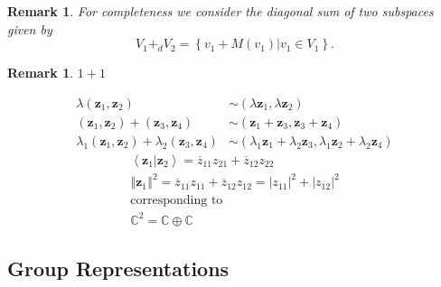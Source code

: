 \documentclass[aps,preprint]{revtex4}
\newtheorem{remark}[theorem]{Remark}
\begin{document}
\begin{remark}
For completeness we consider the \emph{diagonal} \emph{sum of two subspaces }%
given by\emph{\ }%
\begin{equation}
V_{1}+_{d}V_{2}=\left\{ \left. v_{1}+M\left( v_{1}\right) \right\vert
v_{1}\in V_{1}\right\} .
\end{equation}
\end{remark}

\begin{remark}
$1+1$
\end{remark}

\begin{align}
\lambda \left( \mathbf{z}_{1},\mathbf{z}_{2}\right) & \sim \left( \lambda 
\mathbf{z}_{1},\lambda \mathbf{z}_{2}\right) \\
\left( \mathbf{z}_{1},\mathbf{z}_{2}\right) +\left( \mathbf{z}_{3},\mathbf{z}%
_{4}\right) & \sim \left( \mathbf{z}_{1}+\mathbf{z}_{3},\mathbf{z}_{3}+%
\mathbf{z}_{4}\right) \\
\lambda _{1}\left( \mathbf{z}_{1},\mathbf{z}_{2}\right) +\lambda _{2}\left( 
\mathbf{z}_{3},\mathbf{z}_{4}\right) & \sim \left( \lambda _{1}\mathbf{z}%
_{1}+\lambda _{2}\mathbf{z}_{3},\lambda _{1}\mathbf{z}_{2}+\lambda _{2}%
\mathbf{z}_{4}\right)
\end{align}%
\begin{gather}
\left\langle \left. \mathbf{z}_{1}\right\vert \mathbf{z}_{2}\right\rangle =%
\overline{z}_{11}z_{21}+\overline{z}_{12}z_{22}\text{ } \\
\left\Vert \mathbf{z}_{1}\right\Vert ^{2}=\overline{z}_{11}z_{11}+\overline{z%
}_{12}z_{12}=\left\vert z_{11}\right\vert ^{2}+\left\vert z_{12}\right\vert
^{2} \\
\text{corresponding to } \\
\mathbb{C}^{2}=\mathbb{C\oplus C}
\end{gather}

\subsection{Group Representations}
\end{document}
